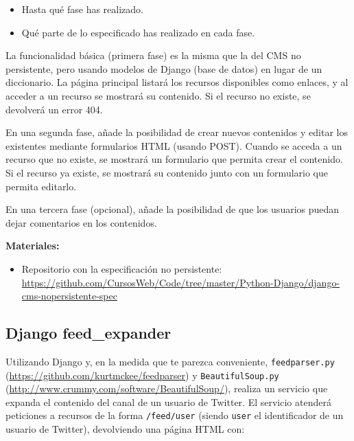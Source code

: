 \begin{itemize}
\item Hasta qué fase has realizado.
\item Qué parte de lo especificado has realizado en cada fase.
\end{itemize}

La funcionalidad básica (primera fase) es la misma que la del CMS no persistente, pero usando modelos de Django (base de datos) en lugar de un diccionario. La página principal listará los recursos disponibles como enlaces, y al acceder a un recurso se mostrará su contenido. Si el recurso no existe, se devolverá un error 404.

En una segunda fase, añade la posibilidad de crear nuevos contenidos y editar los existentes mediante formularios HTML (usando POST). Cuando se acceda a un recurso que no existe, se mostrará un formulario que permita crear el contenido. Si el recurso ya existe, se mostrará su contenido junto con un formulario que permita editarlo.

En una tercera fase (opcional), añade la posibilidad de que los usuarios puedan dejar comentarios en los contenidos.

\textbf{Materiales:}

\begin{itemize}
\item Repositorio con la especificación no persistente: \\
  \url{https://github.com/CursosWeb/Code/tree/master/Python-Django/django-cms-nopersistente-spec}
\end{itemize}



\subsection{Django feed\_expander}
\label{subsec:django-feed-expander}

Utilizando Django y, en la medida que te parezca conveniente, \texttt{feedparser.py} (\url{https://github.com/kurtmckee/feedparser}) y \texttt{BeautifulSoup.py} (\url{http://www.crummy.com/software/BeautifulSoup/}), realiza un servicio que expanda el contenido del canal de un usuario de Twitter. El servicio atenderá peticiones a recursos de la forma \verb|/feed/user| (siendo  \texttt{user} el identificador de un usuario de Twitter), devolviendo una página HTML con:

